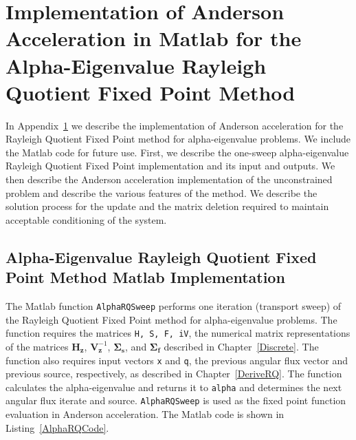 \chapter[Implementation of Anderson Acceleration in Matlab for the Alpha-Eigenvalue Rayleigh Quotient Fixed Point Method][Anderson Acceleration Matlab Implementation]{Implementation of Anderson Acceleration in Matlab for the Alpha-Eigenvalue Rayleigh Quotient Fixed Point Method}

\label{AnderAccMATLAB}

In Appendix~\ref{AnderAccMATLAB} we describe the implementation of Anderson acceleration for the Rayleigh Quotient Fixed Point method for alpha-eigenvalue problems. We include the Matlab code for future use. First, we describe the one-sweep alpha-eigenvalue Rayleigh Quotient Fixed Point implementation and its input and outputs. We then describe the Anderson acceleration implementation of the unconstrained problem and describe the various features of the method. We describe the solution process for the update and the matrix deletion required to maintain acceptable conditioning of the system.

\section{Alpha-Eigenvalue Rayleigh Quotient Fixed Point Method Matlab Implementation}

\label{sec:AlphaRQSweep}

The Matlab function \texttt{AlphaRQSweep} performs one iteration (transport sweep) of the Rayleigh Quotient Fixed Point method for alpha-eigenvalue problems. The function requires the matrices \texttt{H, S, F, iV}, the numerical matrix representations of the matrices $\mathbf{H}_{\mathbf{z}}$, $\mathbf{V}_{\mathbf{z}}^{-1}$, $\mathbf{\Sigma_{s}}$, and $\mathbf{\Sigma_{f}}$ described in Chapter~\ref{Discrete}. The function also requires input vectors \texttt{x} and \texttt{q}, the previous angular flux vector and previous source, respectively, as described in Chapter~\ref{DeriveRQ}. The function calculates the alpha-eigenvalue and returns it to \texttt{alpha} and determines the next angular flux iterate and source. \texttt{AlphaRQSweep} is used as the fixed point function evaluation in Anderson acceleration. The Matlab code is shown in Listing~\ref{AlphaRQCode}.

\clearpage



